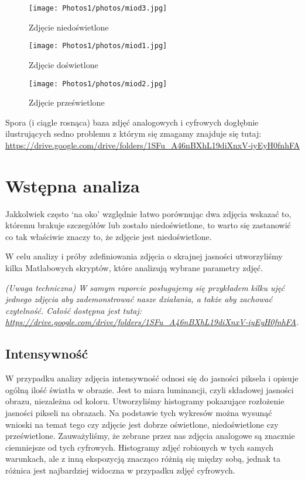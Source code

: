 \documentclass[]{mwart}
\begin{document}
\begin{figure}[H]
    \centering
    \texttt{[image: Photos1/photos/miod3.jpg]}
    \caption{Zdjęcie niedoświetlone}
\end{figure}
\begin{figure}[H]
    \centering
    \texttt{[image: Photos1/photos/miod1.jpg]}
    \caption{Zdjęcie doświetlone}
\end{figure}
\begin{figure}[H]
    \centering
    \texttt{[image: Photos1/photos/miod2.jpg]}
    \caption{Zdjęcie prześwietlone}
\end{figure}


Spora (i ciągle rosnąca) baza zdjęć analogowych i cyfrowych dogłębnie ilustrujących
sedno problemu z którym się zmagamy znajduje się tutaj:
\url{https://drive.google.com/drive/folders/1SFu_A46nBXhL19diXnxV-iyEyH0fnhFA}








\section{Wstępna analiza}
Jakkolwiek często `na oko' względnie łatwo porównując dwa zdjęcia wskazać
to, któremu brakuje szczegółów lub zostało niedoświetlone, to warto się
zastanowić co tak właściwie znaczy to, że zdjęcie jest niedoświetlone. \newline

W celu analizy i próby zdefiniowania zdjęcia o skrajnej jasności
utworzyliśmy kilka Matlabowych skryptów, które analizują wybrane
parametry zdjęć. \newline

\textit{(Uwaga techniczna) W samym raporcie posługujemy się przykładem
    kilku ujęć jednego zdjęcia aby zademonstrować nasze działania, a także
    aby zachować czytelność. Całość dostępna jest tutaj: \url{https://drive.google.com/drive/folders/1SFu_A46nBXhL19diXnxV-iyEyH0fnhFA}.}


\newpage
\subsection{Intensywność}
W przypadku analizy zdjęcia intensywność odnosi się do jasności piksela i
opisuje ogólną ilość światła w obrazie. Jest to miara luminancji, czyli składowej
jasności obrazu, niezależna od koloru. Utworzyliśmy histogramy pokazujące rozłożenie
jasności pikseli na obrazach. Na podstawie tych wykresów można wysunąć wnioski na
temat tego czy zdjęcie jest dobrze oświetlone, niedoświetlone czy prześwietlone.
Zauważyliśmy, że zebrane przez nas zdjęcia analogowe są znacznie ciemniejsze od
tych cyfrowych. Histogramy zdjęć robionych w tych samych warunkach, ale z inną
ekspozycją znacząco różnią się między sobą, jednak ta różnica jest najbardziej
widoczna w przypadku zdjęć cyfrowych.
\end{document}
